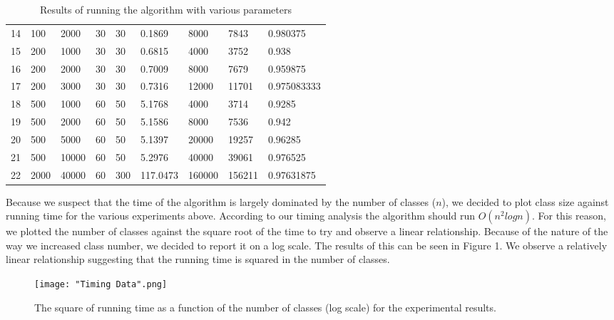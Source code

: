 \documentclass[11pt, oneside]{article}   	%
\begin{document}
\begin{table}[h]
\begin{tabular}{lllllllll}
14  & 100     & 2000     & 30    & 30    & 0.1869     & 8000   & 7843         & 0.980375     \\
15  & 200     & 1000     & 30    & 30    & 0.6815     & 4000   & 3752         & 0.938        \\
16  & 200     & 2000     & 30    & 30    & 0.7009     & 8000   & 7679         & 0.959875     \\
17  & 200     & 3000     & 30    & 30    & 0.7316     & 12000  & 11701        & 0.975083333  \\
18  & 500     & 1000     & 60    & 50    & 5.1768     & 4000   & 3714         & 0.9285       \\
19  & 500     & 2000     & 60    & 50    & 5.1586     & 8000   & 7536         & 0.942        \\
20  & 500     & 5000     & 60    & 50    & 5.1397     & 20000  & 19257        & 0.96285      \\
21  & 500     & 10000    & 60    & 50    & 5.2976     & 40000  & 39061        & 0.976525     \\
22  & 2000    & 40000    & 60    & 300   & 117.0473   & 160000 & 156211       & 0.97631875  
\end{tabular}
\caption{Results of running the algorithm with various parameters}
\label{my-label}
\end{table}
Because we suspect that the time of the algorithm is largely dominated by the number of classes ($n$), we decided to plot class size against running time for the various experiments above. According to our timing analysis the algorithm should run $O(n^2logn)$. For this reason, we plotted the number of classes against the square root of the time to try and observe a linear relationship. Because of the nature of the way we increased class number, we decided to report it on a log scale. The results of this can be seen in Figure 1. We observe a relatively linear relationship suggesting that the running time is squared in the number of classes.
\begin{figure}[h]
\texttt{[image: "Timing Data".png]}
\centering
\caption{The square of running time as a function of the number of classes (log scale) for the experimental results.}
\end{figure}
\end{document}
